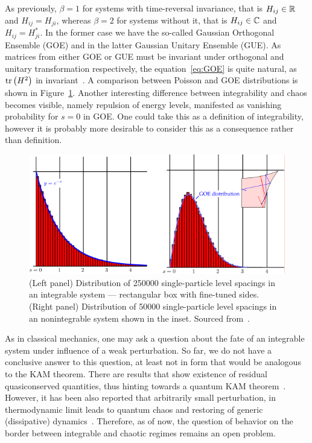 As previously, \(\beta = 1\) for systems with time-reversal invariance, that is
\(H_{ij}\in \mathbb{R}\) and \(H_{ij} = H_{ji}\), whereas \(\beta = 2\) for systems without it,
that is \(H_{ij} \in \mathbb{C}\) and \(H_{ij} = H_{ji}^{\ast}\). In the former case we have
the so-called Gaussian Orthogonal Ensemble (GOE) and in the latter Gaussian Unitary Ensemble (GUE).
As matrices from either GOE or GUE must be invariant under orthogonal and unitary transformation
respectively, the equation~\eqref{eq:GOE} is quite natural, as \(\tr\left(H^2\right)\) in 
invariant~\autocite{DAlessio2016}. A comparison between Poisson and GOE distributions
is shown in Figure~\ref{fig:spacing}. Another interesting difference between integrability and
chaos becomes visible, namely repulsion of energy levels, manifested as vanishing probability
for \(s=0\) in GOE. One could take this as a definition of integrability, however it is probably
more desirable to consider this as a consequence rather than definition.
\begin{figure}[htbp]
    \centering
    \includegraphics[width=1.0\textwidth,trim={0.03cm 0.03cm 0.03cm 0.03cm},clip]{Figures/spacing.pdf}
    \caption{(Left panel) Distribution of 250000 single-particle level spacings in an integrable system
    --- rectangular box with fine-tuned sides. (Right panel) Distribution of 50000 single-particle
    level spacings in an nonintegrable system shown in the inset. Sourced from~\autocite{DAlessio2016,Rudnick2008}.
     }
    \label{fig:spacing}
\end{figure}

As in classical mechanics, one may ask a question about the fate of an integrable system
under influence of a weak perturbation. So far, we do not have a conclusive answer to this
question, at least not in form that would be analogous to the KAM theorem. There are results
that show existence of residual quasiconserved quantities, thus hinting towards a
quantum KAM theorem~\autocite{Brandino2015}. However, it has been also reported that
arbitrarily small perturbation, in thermodynamic limit leads to quantum chaos and restoring
of generic (dissipative) dynamics~\autocite{LeBlond2021}. Therefore, as of now, the question of behavior
on the border between integrable and chaotic regimes remains an open problem.